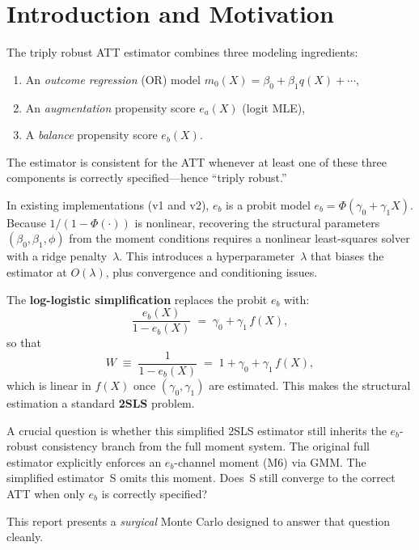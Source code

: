 \documentclass[11pt,letterpaper]{article}
\begin{document}
\section{Introduction and Motivation}

The triply robust ATT estimator combines three modeling ingredients:
\begin{enumerate}[nosep]
  \item An \emph{outcome regression} (OR) model $m_0(X) = \beta_0 + \beta_1 q(X) + \cdots$,
  \item An \emph{augmentation} propensity score $e_a(X)$ (logit MLE),
  \item A \emph{balance} propensity score $e_b(X)$.
\end{enumerate}
The estimator is consistent for the ATT whenever at least one of these
three components is correctly specified---hence ``triply robust.''

\medskip\noindent
In existing implementations (v1 and v2), $e_b$ is a probit model
$e_b = \Phi(\gamma_0 + \gamma_1 X)$.  Because $1/(1-\Phi(\cdot))$
is nonlinear, recovering the structural parameters
$(\beta_0,\beta_1,\phi)$ from the moment conditions requires a
nonlinear least-squares solver with a ridge penalty~$\lambda$.
This introduces a hyperparameter~$\lambda$ that biases the estimator
at $O(\lambda)$, plus convergence and conditioning issues.

\medskip\noindent
The \textbf{log-logistic simplification} replaces the probit $e_b$ with:
\[
  \frac{e_b(X)}{1 - e_b(X)} \;=\; \gamma_0 + \gamma_1\, f(X),
\]
so that
\[
  W \;\equiv\; \frac{1}{1 - e_b(X)} \;=\; 1 + \gamma_0 + \gamma_1\, f(X),
\]
which is linear in $f(X)$ once $(\gamma_0,\gamma_1)$ are estimated.
This makes the structural estimation a standard \textbf{2SLS} problem.

\medskip\noindent
A crucial question is whether this simplified 2SLS estimator still
inherits the $e_b$-robust consistency branch from the full moment
system.  The original full estimator explicitly enforces an
$e_b$-channel moment (M6) via GMM.  The simplified estimator~S omits
this moment.  Does~S still converge to the correct ATT when only $e_b$
is correctly specified?

This report presents a \emph{surgical} Monte Carlo designed to answer
that question cleanly.


\end{document}
